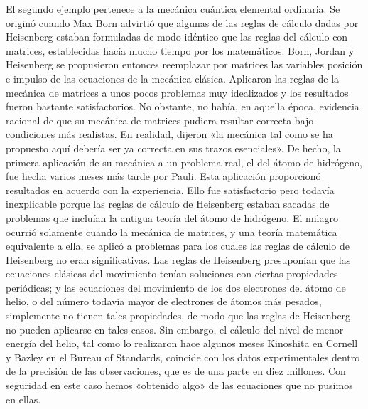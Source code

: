 \documentclass[a4paper, 12pt]{article}
\begin{document}
El segundo ejemplo pertenece a la mecánica cuántica elemental ordinaria. Se originó cuando Max Born advirtió que algunas de las reglas de cálculo dadas por Heisenberg estaban formuladas de modo idéntico que las reglas del cálculo con matrices, establecidas hacía mucho tiempo por los matemáticos. Born, Jordan y Heisenberg se propusieron entonces reemplazar por matrices las variables posición e impulso de las ecuaciones de la mecánica clásica. Aplicaron las reglas de la mecánica de matrices a unos pocos problemas muy idealizados y los resultados fueron bastante satisfactorios. No obstante, no había, en aquella época, evidencia racional de que su mecánica de matrices pudiera resultar correcta bajo condiciones más realistas. En realidad, dijeron «la mecánica tal como se ha propuesto aquí debería ser ya correcta en sus trazos esenciales». De hecho, la primera aplicación de su mecánica a un problema real, el del átomo de hidrógeno, fue hecha varios meses más tarde por Pauli. Esta aplicación proporcionó resultados en acuerdo con la experiencia. Ello fue satisfactorio pero todavía inexplicable porque las reglas de cálculo de Heisenberg estaban sacadas de problemas que incluían la antigua teoría del átomo de hidrógeno. El milagro ocurrió solamente cuando la mecánica de matrices, y una teoría matemática equivalente a ella, se aplicó a problemas para los cuales las reglas de cálculo de Heisenberg no eran significativas. Las reglas de Heisenberg presuponían que las ecuaciones clásicas del movimiento tenían soluciones con ciertas propiedades periódicas; y las ecuaciones del movimiento de los dos electrones del átomo de helio, o del número todavía mayor de electrones de átomos más pesados, simplemente no tienen tales propiedades, de modo que las reglas de Heisenberg no pueden aplicarse en tales casos. Sin embargo, el cálculo del nivel de menor energía del helio, tal como lo realizaron hace algunos meses Kinoshita en Cornell y Bazley en el Bureau of Standards, coincide con los datos experimentales dentro de la precisión de las observaciones, que es de una parte en diez millones. Con seguridad en este caso hemos «obtenido algo» de las ecuaciones que no pusimos en ellas.
\end{document}
